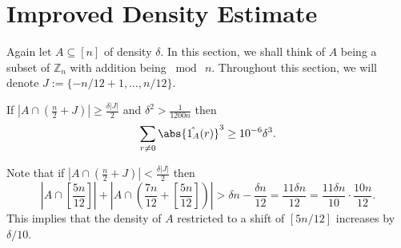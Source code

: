\documentclass{article}
\begin{document}
\section{Improved Density Estimate}
Again let $A\subseteq [n]$ of density $\delta$. In this section, we shall think of $A$ being a subset of $\mathbb{Z}_n$ with addition being $\bmod ~n$. Throughout this section, we will denote $J := \{-n/12+1,\ldots,n/12\}$.
\begin{claim}\label{claim:large-norm}
If $\left|A\cap\left(\frac{n}{2}+J\right)\right| \geq \frac{\delta |J|}{2}$ and $\delta^2 > \frac{1}{1200n}$ then 
\begin{equation}\label{eq:large-norm}
\sum_{r\neq 0}\abs{\hat{1_A}(r)}^3 \geq 10^{-6}\delta^3.
\end{equation}
\end{claim}
Note that if $\left|A\cap\left(\frac{n}{2}+J\right)\right| < \frac{\delta |J|}{2}$ then  $$\left|A\cap\left[\frac{5n}{12}\right]\right|+ \left|A\cap\left(\frac{7n}{12} + \left[\frac{5n}{12}\right]\right)\right| > \delta n - \frac{\delta n}{12} =  \frac{11\delta n}{12} = \frac{11\delta n}{10}\cdot\frac{10n}{12}.$$ This implies that the density of $A$ restricted to a shift of $[5n/12]$ increases by $\delta/10$.
\end{document}
